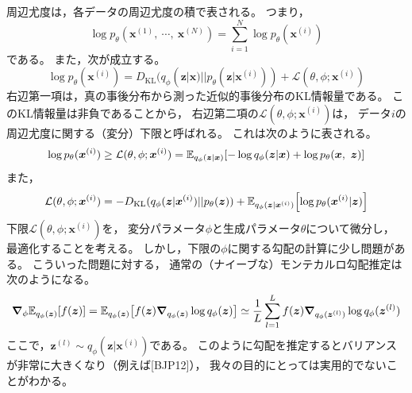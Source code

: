\documentclass[dvipdfmx, fleqn]{jsarticle}
\begin{document}
周辺尤度は，各データの周辺尤度の積で表される。
つまり，
\begin{equation*}
    \log{p_{\theta} (\bm{x}^{(1)},\ \cdots,\ \bm{x}^{(N)})} = \sum_{i=1}^{N} \log{p_{\theta} (\bm{x}^{(i)})}
\end{equation*}
である。
また，次が成立する。
\begin{equation}
    \log{p_{\theta} (\bm{x}^{(i)})}
        = D_\mathrm{KL} (q_{\phi} (\bm{z} | \bm{x}) || p_{\theta} (\bm{z} | \bm{x}^{(i)}))
            + \mathcal{L} (\theta, \phi; \bm{x}^{(i)})
    \label{eq:marginal_log_likelihood}
\end{equation}
右辺第一項は，真の事後分布から測った近似的事後分布のKL情報量である。
このKL情報量は非負であることから，
右辺第二項の\(\mathcal{L} (\theta, \phi; \bm{x}^{(i)})\)は，
データ\(i\)の周辺尤度に関する（変分）下限と呼ばれる。
これは次のように表される。
\begin{equation}
    \log{p_{\theta} (\bm{x}^{(i)})}
        \ge \mathcal{L} (\theta, \phi; \bm{x}^{(i)})
        = \mathbb{E}_{q_{\phi} (\bm{z} | \bm{x})} \qty[-\log{q_{\phi} (\bm{z} | \bm{x})} + \log{p_{\theta} (\bm{x},\ \bm{z})}]
    \label{eq:derivation_variational_lower_bound}
\end{equation}
また，
\begin{equation}
    \mathcal{L} (\theta, \phi; \bm{x}^{(i)})
        = -D_\mathrm{KL} (q_{\phi} (\bm{z} | \bm{x}^{(i)}) || p_{\theta} (\bm{z}))
            + \mathbb{E}_{q_{\phi} (\bm{z} | \bm{x}^{(i)})} \qty[\log{p_{\theta} (\bm{x}^{(i)} | \bm{z})}]
    \label{eq:variational_lower_bound}
\end{equation}
下限\(\mathcal{L} (\theta, \phi; \bm{x}^{(i)})\)を，
変分パラメータ\(\phi\)と生成パラメータ\(\theta\)について微分し，
最適化することを考える。
しかし，下限の\(\phi\)に関する勾配の計算に少し問題がある。
こういった問題に対する，
通常の（ナイーブな）モンテカルロ勾配推定は次のようになる。
\begin{equation*}
    \grad_{\phi} \mathbb{E}_{q_{\phi} (\bm{z})} \qty[f(\bm{z})]
        = \mathbb{E}_{q_{\phi} (\bm{z})} \qty[f(\bm{z}) \grad_{q_{\phi} (\bm{z})} \log{q_{\phi} (\bm{z})}]
        \simeq \frac{1}{L} \sum_{l=1}^{L} f(\bm{z}) \grad_{q_{\phi} (\bm{z}^{(l)})} \log{q_{\phi} (\bm{z}^{(l)})}
\end{equation*}
ここで，\(\bm{z}^{(l)} \sim q_{\phi} (\bm{z} | \bm{x}^{(i)})\)である。
このように勾配を推定するとバリアンスが非常に大きくなり（例えば[BJP12]），
我々の目的にとっては実用的でないことがわかる。
\end{document}
